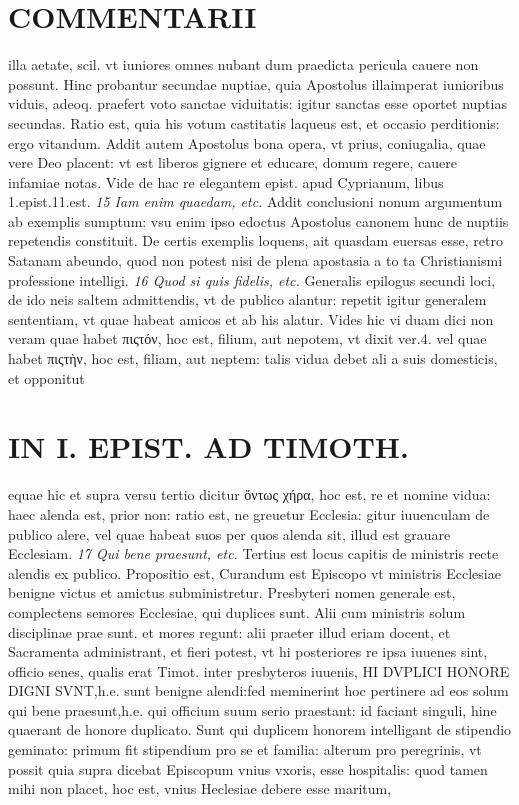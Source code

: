 \documentclass{article}
\begin{document}
\begin{pages}
\section*{COMMENTARII }
\marginpar{[ p.130 ]}\pstart illa aetate, scil. vt iuniores omnes nubant dum praedicta pericula cauere non possunt. Hinc probantur secundae nuptiae, quia Apostolus illaimperat iunioribus  viduis, adeoq. praefert voto sanctae viduitatis: igitur sanctas esse oportet nuptias secundas. Ratio est, quia his votum castitatis laqueus est, et occasio perditionis: ergo vitandum. Addit autem Apostolus bona opera, vt prius, coniugalia, quae vere Deo placent: vt est liberos gignere et educare, domum regere, cauere infamiae notas. Vide de hac re elegantem epist. apud Cyprianum, libus 1.epist.11.est.  \pend
\textit{15 Iam enim quaedam, etc. }\pstart Addit conclusioni nonum argumentum ab exemplis sumptum: vsu enim ipso edoctus Apostolus canonem hunc de nuptiis repetendis constituit. De certis exemplis loquens, ait quasdam euersas esse, retro Satanam abeundo, quod non potest nisi de plena apostasia a to ta Christianismi professione intelligi.  \pend
\textit{16 Quod si quis fidelis, etc. }\pstart Generalis epilogus secundi loci, de ido neis saltem admittendis, vt de publico alantur: repetit igitur generalem sententiam, vt quae habeat amicos et ab his alatur. Vides hic vi duam dici non veram quae habet πιςτόν, hoc est, filium, aut nepotem, vt dixit ver.4. vel quae habet πιςτὴν, hoc est, filiam, aut neptem: talis vidua debet ali a suis domesticis, et opponitut  \pend
\section*{IN I. EPIST. AD TIMOTH. }
\marginpar{[ p.131 ]}\pstart equae hic et supra versu tertio dicitur ὄντως χήρα, hoc est, re et nomine vidua: haec alenda est, prior non: ratio est, ne greuetur Ecclesia: gitur iuuenculam de publico alere, vel quae habeat suos per quos alenda sit, illud est grauare Ecclesiam.  \pend
\textit{17 Qui bene praesunt, etc. }\pstart Tertius est locus capitis de ministris recte alendis ex publico. Propositio est, Curandum est Episcopo vt ministris Ecclesiae benigne victus et amictus subministretur. Presbyteri nomen generale est, complectens semores Ecclesiae, qui duplices sunt.  \pend\pstart Alii cum ministris solum disciplinae prae sunt. et mores regunt: alii praeter illud eriam docent, et Sacramenta administrant, et fieri potest, vt hi posteriores re ipsa iuuenes sint, officio senes, qualis erat Timot. inter presbyteros iuuenis, HI DVPLICI HONORE DIGNI SVNT,h.e. sunt benigne alendi:fed meminerint hoc pertinere ad eos solum qui bene praesunt,h.e. qui officium suum serio praestant: id faciant singuli, hine quaerant de honore duplicato.  \pend\pstart Sunt qui duplicem honorem intelligant de stipendio geminato: primum fit stipendium pro se et familia: alterum pro peregrinis, vt possit quia supra dicebat Episcopum vnius vxoris, esse hospitalis: quod tamen mihi non placet, hoc est, vnius Heclesiae debere esse maritum,  \pend

\end{pages}
\end{document}
